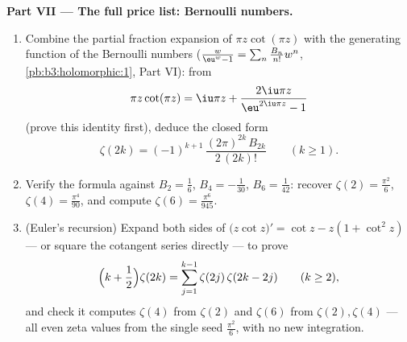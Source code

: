 \begin{problem}
\begin{enumerate}[resume]
\end{enumerate}
\medskip
\noindent\textbf{Part VII --- The full price list: Bernoulli
numbers.}
\begin{enumerate}[resume]
  \item Combine the partial fraction expansion of $\pi
        z\cot(\pi z)$ with the generating function of the
        Bernoulli numbers ($\frac{w}{\eu^w - 1} =
        \sum_n\frac{B_n}{n!}w^n$,
        \cref{pb:b3:holomorphic:1}, Part VI): from
        \[
        \pi z\cot(\pi z) = \iu\pi z +
        \frac{2\iu\pi z}{\eu^{2\iu\pi z} - 1}
        \]
        (prove this identity first), deduce the closed form
        \[
        \zeta(2k) = (-1)^{k+1}\,
        \frac{(2\pi)^{2k}\,B_{2k}}{2\,(2k)!}
        \qquad (k \geq 1).
        \]
  \item Verify the formula against $B_2 = \frac16$, $B_4 =
        -\frac1{30}$, $B_6 = \frac1{42}$: recover $\zeta(2) =
        \frac{\pi^2}6$, $\zeta(4) = \frac{\pi^4}{90}$, and
        compute $\zeta(6) = \frac{\pi^6}{945}$.
  \item (Euler's recursion) Expand both sides of
        $\bigl(z\cot z\bigr)' = \cot z - z(1 + \cot^2z)$ ---
        or square the cotangent series directly --- to prove
        \[
        \Bigl(k + \frac12\Bigr)\zeta(2k) =
        \sum_{j=1}^{k-1}\zeta(2j)\,\zeta(2k - 2j)
        \qquad (k \geq 2),
        \]
        and check it computes $\zeta(4)$ from $\zeta(2)$ and
        $\zeta(6)$ from $\zeta(2), \zeta(4)$ --- all even
        zeta values from the single seed $\frac{\pi^2}6$,
        with no new integration.
\end{enumerate}
\end{problem}
